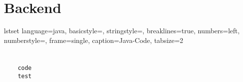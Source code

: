 \section{Backend}

lstset{
	language=java, 				%
	basicstyle=\scriptsize\ttfamily, 	%
	stringstyle=\ttfamily, 			%
	breaklines=true, 			%
	numbers=left, 				%
	numberstyle=\tiny, 			%
	frame=single, 				%
	caption={Java-Code}, 			%
	tabsize=2				%
} 

\begin{frame}\frametitle{}



    \begin{lstlisting}
    
    code
    test
    \end{lstlisting}

\end{frame}